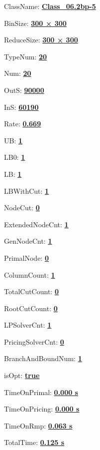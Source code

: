 \documentclass[11pt]{article}
\begin{document}
\pagestyle{empty}


ClassName: \underline{\textbf{Class_06.2bp-5}}
\par
BinSize: \underline{\textbf{300 × 300}}
\par
ReduceSize: \underline{\textbf{300 × 300}}
\par
TypeNum: \underline{\textbf{20}}
\par
Num: \underline{\textbf{20}}
\par
OutS: \underline{\textbf{90000}}
\par
InS: \underline{\textbf{60190}}
\par
Rate: \underline{\textbf{0.669}}
\par
UB: \underline{\textbf{1}}
\par
LB0: \underline{\textbf{1}}
\par
LB: \underline{\textbf{1}}
\par
LBWithCut: \underline{\textbf{1}}
\par
NodeCut: \underline{\textbf{0}}
\par
ExtendedNodeCnt: \underline{\textbf{1}}
\par
GenNodeCnt: \underline{\textbf{1}}
\par
PrimalNode: \underline{\textbf{0}}
\par
ColumnCount: \underline{\textbf{1}}
\par
TotalCutCount: \underline{\textbf{0}}
\par
RootCutCount: \underline{\textbf{0}}
\par
LPSolverCnt: \underline{\textbf{1}}
\par
PricingSolverCnt: \underline{\textbf{0}}
\par
BranchAndBoundNum: \underline{\textbf{1}}
\par
isOpt: \underline{\textbf{true}}
\par
TimeOnPrimal: \underline{\textbf{0.000 s}}
\par
TimeOnPricing: \underline{\textbf{0.000 s}}
\par
TimeOnRmp: \underline{\textbf{0.063 s}}
\par
TotalTime: \underline{\textbf{0.125 s}}
\par
\newpage
\end{document}

